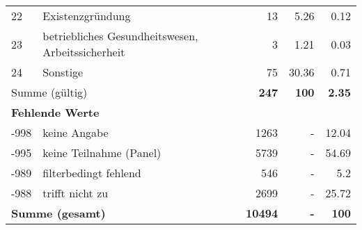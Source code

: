 \begin{longtable}{lXrrr}
        22 & \multicolumn{1}{X}{Existenzgründung} & %
          \num{13} &
          \num[round-mode=places,round-precision=2]{5,26} &
          \num[round-mode=places,round-precision=2]{0,12} \\

        23 & \multicolumn{1}{X}{betriebliches Gesundheitswesen, Arbeitssicherheit} & %
          \num{3} &
          \num[round-mode=places,round-precision=2]{1,21} &
          \num[round-mode=places,round-precision=2]{0,03} \\

        24 & \multicolumn{1}{X}{Sonstige} & %
          \num{75} &
          \num[round-mode=places,round-precision=2]{30,36} &
          \num[round-mode=places,round-precision=2]{0,71} \\

     \midrule
     \multicolumn{2}{l}{Summe (gültig)} &
       \textbf{\num{247}} &
     \textbf{100} &
       \textbf{\num[round-mode=places,round-precision=2]{2,35}} \\
     \multicolumn{5}{l}{\textbf{Fehlende Werte}}\\
       -998 &
       keine Angabe &
         \num{1263} &
        - &
         \num[round-mode=places,round-precision=2]{12,04} \\
       -995 &
       keine Teilnahme (Panel) &
         \num{5739} &
        - &
         \num[round-mode=places,round-precision=2]{54,69} \\
       -989 &
       filterbedingt fehlend &
         \num{546} &
        - &
         \num[round-mode=places,round-precision=2]{5,2} \\
       -988 &
       trifft nicht zu &
         \num{2699} &
        - &
         \num[round-mode=places,round-precision=2]{25,72} \\
     \midrule
     \multicolumn{2}{l}{\textbf{Summe (gesamt)}} &
          \textbf{\num{10494}} &
        \textbf{-} &
        \textbf{100} \\
     \bottomrule
     \end{longtable}
     
